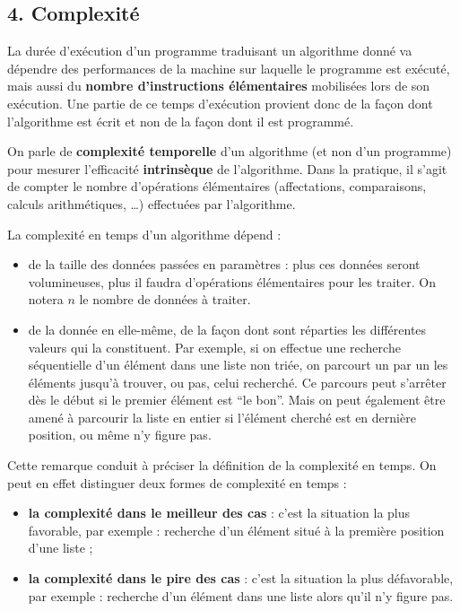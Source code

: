 \documentclass[
  a4paper,
  DIV=11,
  numbers=noendperiod]{scrartcl}
\providecommand{\tightlist}{%
  \setlength{\itemsep}{0pt}\setlength{\parskip}{0pt}}\usepackage{longtable,booktabs,array}
\begin{document}
\hypertarget{complexituxe9}{%
\subsection{4. Complexité}\label{complexituxe9}}

La durée d'exécution d'un programme traduisant un algorithme donné va
dépendre des performances de la machine sur laquelle le programme est
exécuté, mais aussi du \textbf{nombre d'instructions élémentaires}
mobilisées lors de son exécution. Une partie de ce temps d'exécution
provient donc de la façon dont l'algorithme est écrit et non de la façon
dont il est programmé.

On parle de \textbf{complexité temporelle} d'un algorithme (et non d'un
programme) pour mesurer l'efficacité \textbf{intrinsèque} de
l'algorithme. Dans la pratique, il s'agit de compter le nombre
d'opérations élémentaires (affectations, comparaisons, calculs
arithmétiques, \ldots) effectuées par l'algorithme.

La complexité en temps d'un algorithme dépend :

\begin{itemize}
\tightlist
\item
  de la taille des données passées en paramètres : plus ces données
  seront volumineuses, plus il faudra d'opérations élémentaires pour les
  traiter. On notera \(n\) le nombre de données à traiter.
\item
  de la donnée en elle-même, de la façon dont sont réparties les
  différentes valeurs qui la constituent. Par exemple, si on effectue
  une recherche séquentielle d'un élément dans une liste non triée, on
  parcourt un par un les éléments jusqu'à trouver, ou pas, celui
  recherché. Ce parcours peut s'arrêter dès le début si le premier
  élément est ``le bon''. Mais on peut également être amené à parcourir
  la liste en entier si l'élément cherché est en dernière position, ou
  même n'y figure pas.
\end{itemize}

Cette remarque conduit à préciser la définition de la complexité en
temps. On peut en effet distinguer deux formes de complexité en temps :

\begin{itemize}
\tightlist
\item
  \textbf{la complexité dans le meilleur des cas} : c'est la situation
  la plus favorable, par exemple : recherche d'un élément situé à la
  première position d'une liste ;
\item
  \textbf{la complexité dans le pire des cas} : c'est la situation la
  plus défavorable, par exemple : recherche d'un élément dans une liste
  alors qu'il n'y figure pas.
\end{itemize}
\end{document}
